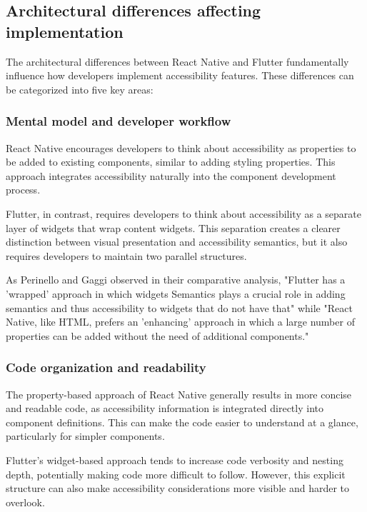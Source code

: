 \subsection{Architectural differences affecting implementation}

The architectural differences between React Native and Flutter fundamentally influence how developers implement accessibility features. These differences can be categorized into five key areas:

\subsubsection{Mental model and developer workflow}
React Native encourages developers to think about accessibility as properties to be added to existing components, similar to adding styling properties. This approach integrates accessibility naturally into the component development process.

Flutter, in contrast, requires developers to think about accessibility as a separate layer of widgets that wrap content widgets. This separation creates a clearer distinction between visual presentation and accessibility semantics, but it also requires developers to maintain two parallel structures.

As Perinello and Gaggi \cite{perinello2024accessibility} observed in their comparative analysis, "Flutter has a 'wrapped' approach in which widgets Semantics plays a crucial role in adding semantics and thus accessibility to widgets that do not have that" while "React Native, like HTML, prefers an 'enhancing' approach in which a large number of properties can be added without the need of additional components."

\subsubsection{Code organization and readability}
The property-based approach of React Native generally results in more concise and readable code, as accessibility information is integrated directly into component definitions. This can make the code easier to understand at a glance, particularly for simpler components.

Flutter's widget-based approach tends to increase code verbosity and nesting depth, potentially making code more difficult to follow. However, this explicit structure can also make accessibility considerations more visible and harder to overlook.

